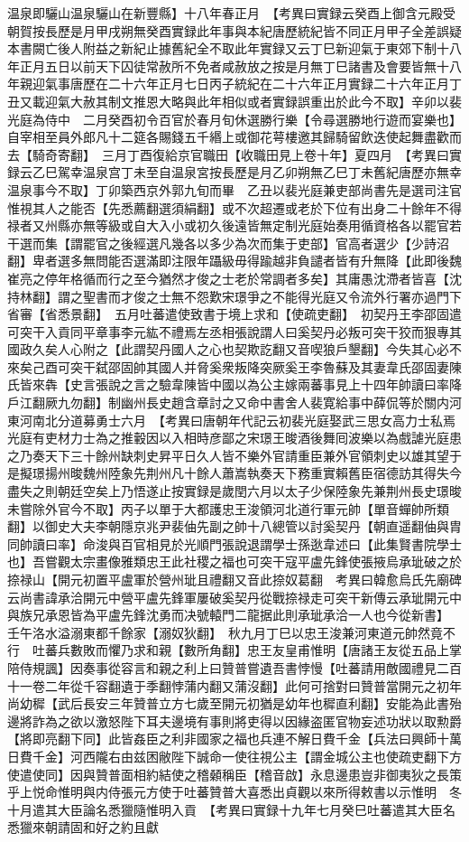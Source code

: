 温泉即驪山温泉驪山在新豐縣】十八年春正月　【考異曰實録云癸酉上御含元殿受朝賀按長歷是月甲戌朔無癸酉實録此年事與本紀唐歷統紀皆不同正月甲子全差誤疑本書闕亡後人附益之新紀止據舊紀全不取此年實録又云丁巳新迎氣于東郊下制十八年正月五日以前天下囚徒常赦所不免者咸赦放之按是月無丁巳諸書及會要皆無十八年親迎氣事唐歷在二十六年正月七日丙子統紀在二十六年正月實録二十六年正月丁丑又載迎氣大赦其制文推恩大略與此年相似或者實録誤重出於此今不取】辛卯以裴光庭為侍中　二月癸酉初令百官於春月旬休選勝行樂【令尋選勝地行遊而宴樂也】自宰相至員外郎凡十二筵各賜錢五千緡上或御花萼樓邀其歸騎留飲迭使起舞盡歡而去【騎奇寄翻】　三月丁酉復給京官職田【收職田見上卷十年】夏四月　【考異曰實録云乙巳駕幸温泉宫丁未至自温泉宮按長歷是月乙卯朔無乙巳丁未舊紀唐歷亦無幸温泉事今不取】丁卯築西京外郭九旬而畢　乙丑以裴光庭兼吏部尚書先是選司注官惟視其人之能否【先悉薦翻選須絹翻】或不次超遷或老於下位有出身二十餘年不得禄者又州縣亦無等級或自大入小或初久後遠皆無定制光庭始奏用循資格各以罷官若干選而集【謂罷官之後經選凡幾各以多少為次而集于吏部】官高者選少【少詩沼翻】卑者選多無問能否選滿即注限年躡級毋得踰越非負譴者皆有升無降【此即後魏崔亮之停年格循而行之至今猶然才俊之士老於常調者多矣】其庸愚沈滯者皆喜【沈持林翻】謂之聖書而才俊之士無不怨歎宋璟爭之不能得光庭又令流外行署亦過門下省審【省悉景翻】　五月吐蕃遣使致書于境上求和【使疏吏翻】　初契丹王李邵固遣可突干入貢同平章事李元紘不禮焉左丞相張說謂人曰奚契丹必叛可突干狡而狠專其國政久矣人心附之【此謂契丹國人之心也契欺訖翻又音喫狼戶墾翻】今失其心必不來矣己酉可突干弑邵固帥其國人并脅奚衆叛降突厥奚王李魯蘇及其妻韋氏邵固妻陳氏皆來犇【史言張說之言之驗韋陳皆中國以為公主嫁兩蕃事見上十四年帥讀曰率降戶江翻厥九勿翻】制幽州長史趙含章討之又命中書舍人裴寛給事中薛侃等於關内河東河南北分道募勇士六月　【考異曰唐朝年代記云初裴光庭娶武三思女高力士私焉光庭有吏材力士為之推轂因以入相時彦鄙之宋璟王晙酒後舞囘波樂以為戲謔光庭患之乃奏天下三十餘州缺刺史昇平日久人皆不樂外官請重臣兼外官領刺史以雄其望于是擬璟揚州晙魏州陸象先荆州凡十餘人蕭嵩執奏天下務重實賴舊臣宿德訪其得失今盡失之則朝廷空矣上乃悟遂止按實録是歲閏六月以太子少保陸象先兼荆州長史璟晙未嘗除外官今不取】丙子以單于大都護忠王浚領河北道行軍元帥【單音蟬帥所類翻】以御史大夫李朝隱京兆尹裴伷先副之帥十八總管以討奚契丹【朝直遥翻伷與胄同帥讀曰率】命浚與百官相見於光順門張說退謂學士孫逖韋述曰【此集賢書院學士也】吾嘗觀太宗畫像雅類忠王此社稷之福也可突干寇平盧先鋒使張掖烏承玼破之於捺禄山【開元初置平盧軍於營州玼且禮翻又音此捺奴葛翻　考異曰韓愈烏氏先廟碑云尚書諱承洽開元中營平盧先鋒軍屢破奚契丹從戰捺禄走可突干新傳云承玼開元中與族兄承恩皆為平盧先鋒沈勇而决號轅門二龍据此則承玼承洽一人也今從新書】　壬午洛水溢溺東都千餘家【溺奴狄翻】　秋九月丁巳以忠王浚兼河東道元帥然竟不行　吐蕃兵數敗而懼乃求和親【數所角翻】忠王友皇甫惟明【唐諸王友從五品上掌陪侍規諷】因奏事從容言和親之利上曰贊普嘗遺吾書悖慢【吐蕃請用敵國禮見二百十一卷二年從千容翻遺于季翻悖蒲内翻又蒲沒翻】此何可捨對曰贊普當開元之初年尚幼穉【武后長安三年贊普立方七歲至開元初猶是幼年也穉直利翻】安能為此書殆邊將詐為之欲以激怒陛下耳夫邊境有事則將吏得以因緣盗匿官物妄述功狀以取勲爵【將即亮翻下同】此皆姦臣之利非國家之福也兵連不解日費千金【兵法曰興師十萬日費千金】河西隴右由兹困敝陛下誠命一使往視公主【謂金城公主也使疏吏翻下方使遣使同】因與贊普面相約結使之稽顙稱臣【稽音啟】永息邊患豈非御夷狄之長策乎上悦命惟明與内侍張元方使于吐蕃贊普大喜悉出貞觀以來所得敕書以示惟明　冬十月遣其大臣論名悉獵隨惟明入貢　【考異曰實録十九年七月癸巳吐蕃遣其大臣名悉獵來朝請固和好之約且獻